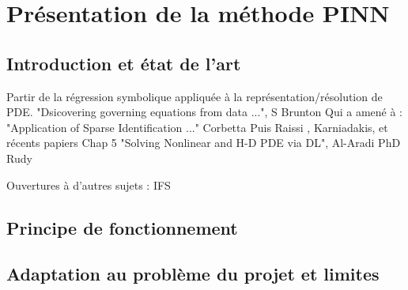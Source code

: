\section{Présentation de la méthode PINN}

\subsection{Introduction et état de l'art}

Partir de la régression symbolique appliquée à la représentation/résolution de PDE.
"Dsicovering governing equations from data ...", S Brunton \cite{bruntonDiscoveringGoverningEquations2016}
Qui a amené à :
"Application of Sparse Identification ..." Corbetta \cite{corbettaApplicationSparseIdentification}
Puis Raissi \cite{raissiPhysicsinformedNeuralNetworks2019,raissiHiddenFluidMechanics2018}, Karniadakis, et récents papiers
Chap 5 "Solving Nonlinear and H-D PDE via DL", Al-Aradi \cite{al-aradiSolvingNonlinearHighDimensional}
PhD Rudy \cite{rudyComputationalMethodsSystem2019}


Ouvertures à d'autres sujets :
IFS \cite{raissiDeepLearningVortexinduced2019a}
\cite{maoPhysicsinformedNeuralNetworks2020}



\subsection{Principe de fonctionnement}

\subsection{Adaptation au problème du projet et limites}


